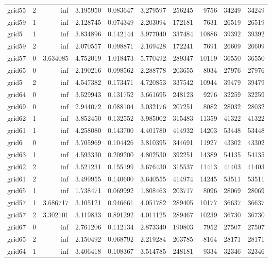 \begin{longtable}{|l|r|r|r|r|r|r|r|r|r|}
grid55 & 2 & inf & 3.195950 & 0.083647 & 3.279597 & 256245 & 9756 & 34249 & 34249 \\
grid59 & 1 & inf & 2.128745 & 0.074349 & 2.203094 & 172181 & 7631 & 26519 & 26519 \\
grid5 & 1 & inf & 3.834896 & 0.142144 & 3.977040 & 337484 & 10886 & 39392 & 39392 \\
grid59 & 2 & inf & 2.070557 & 0.098871 & 2.169428 & 172241 & 7691 & 26609 & 26609 \\
grid57 & 0 & 3.634085 & 4.752019 & 1.018473 & 5.770492 & 289347 & 10119 & 36550 & 36550 \\
grid65 & 0 & inf & 2.190216 & 0.098562 & 2.288778 & 203655 & 8034 & 27976 & 27976 \\
grid5 & 2 & inf & 4.547382 & 0.173471 & 4.720853 & 337542 & 10944 & 39479 & 39479 \\
grid64 & 0 & inf & 3.529943 & 0.131752 & 3.661695 & 248123 & 9276 & 32259 & 32259 \\
grid69 & 0 & inf & 2.944072 & 0.088104 & 3.032176 & 207251 & 8082 & 28032 & 28032 \\
grid62 & 1 & inf & 3.852450 & 0.132552 & 3.985002 & 315483 & 11359 & 41322 & 41322 \\
grid61 & 1 & inf & 4.258080 & 0.143700 & 4.401780 & 414932 & 14203 & 53448 & 53448 \\
grid6 & 0 & inf & 3.705969 & 0.104426 & 3.810395 & 344691 & 11927 & 43302 & 43302 \\
grid63 & 1 & inf & 4.593330 & 0.209200 & 4.802530 & 392251 & 14389 & 54135 & 54135 \\
grid62 & 2 & inf & 3.521231 & 0.155199 & 3.676430 & 315537 & 11413 & 41403 & 41403 \\
grid61 & 2 & inf & 3.499955 & 0.140600 & 3.640555 & 414974 & 14245 & 53511 & 53511 \\
grid65 & 1 & inf & 1.738471 & 0.069992 & 1.808463 & 203717 & 8096 & 28069 & 28069 \\
grid57 & 1 & 3.686717 & 3.105121 & 0.946661 & 4.051782 & 289405 & 10177 & 36637 & 36637 \\
grid57 & 2 & 3.302101 & 3.119833 & 0.891292 & 4.011125 & 289467 & 10239 & 36730 & 36730 \\
grid67 & 0 & inf & 2.761206 & 0.112134 & 2.873340 & 190803 & 7952 & 27507 & 27507 \\
grid65 & 2 & inf & 2.150492 & 0.068792 & 2.219284 & 203785 & 8164 & 28171 & 28171 \\
grid64 & 1 & inf & 3.406418 & 0.108367 & 3.514785 & 248181 & 9334 & 32346 & 32346 \\

\end{longtable}
